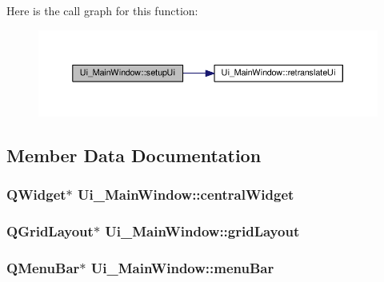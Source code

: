 Here is the call graph for this function\-:\nopagebreak
\begin{figure}[H]
\begin{center}
\leavevmode
\includegraphics[width=350pt]{classUi__MainWindow_acf4a0872c4c77d8f43a2ec66ed849b58_cgraph}
\end{center}
\end{figure}




\subsection{Member Data Documentation}
\hypertarget{classUi__MainWindow_a30075506c2116c3ed4ff25e07ae75f81}{
\subsubsection[{central\-Widget}]{\setlength{\rightskip}{0pt plus 5cm}Q\-Widget$\ast$ Ui\-\_\-\-Main\-Window\-::central\-Widget}}\label{classUi__MainWindow_a30075506c2116c3ed4ff25e07ae75f81}
\hypertarget{classUi__MainWindow_a525ed3c5fe0784ac502ee222fba4e205}{
\subsubsection[{grid\-Layout}]{\setlength{\rightskip}{0pt plus 5cm}Q\-Grid\-Layout$\ast$ Ui\-\_\-\-Main\-Window\-::grid\-Layout}}\label{classUi__MainWindow_a525ed3c5fe0784ac502ee222fba4e205}
\hypertarget{classUi__MainWindow_a2be1c24ec9adfca18e1dcc951931457f}{
\subsubsection[{menu\-Bar}]{\setlength{\rightskip}{0pt plus 5cm}Q\-Menu\-Bar$\ast$ Ui\-\_\-\-Main\-Window\-::menu\-Bar}}\label{classUi__MainWindow_a2be1c24ec9adfca18e1dcc951931457f}
